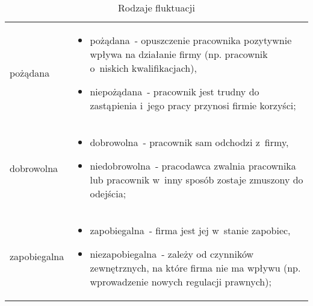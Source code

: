 \noindent\begin{minipage}{\textwidth}
             \begin{table}[H]
                 \raggedright\caption{Rodzaje fluktuacji\label{tabela:fluktuacja-rodzaje}}
                 \begin{center}
                     \begin{tabular}{|P{.15\textwidth}|P{.75\textwidth}|}

                         \hline
                          &
                          \\
                         \hline

                         pożądana &
                         \begin{itemize}
                             \item pożądana~- opuszczenie pracownika pozytywnie wpływa na działanie firmy (np. pracownik o~niskich kwalifikacjach),
                             \item niepożądana~- pracownik jest trudny do zastąpienia i~jego pracy przynosi firmie korzyści;
                         \end{itemize} \\
                         \hline

                         dobrowolna &
                         \begin{itemize}
                             \item dobrowolna~- pracownik sam odchodzi z~firmy,
                             \item niedobrowolna~- pracodawca zwalnia pracownika lub pracownik w~inny sposób zostaje zmuszony do odejścia;
                         \end{itemize} \\
                         \hline

                         zapobiegalna &
                         \begin{itemize}
                             \item zapobiegalna~- firma jest jej w~stanie zapobiec,
                             \item niezapobiegalna~- zależy od czynników zewnętrznych, na które firma nie ma wpływu (np. wprowadzenie nowych regulacji prawnych);
                         \end{itemize} \\
                         \hline


\end{tabular}
\end{center}
\end{table}
\end{minipage}
